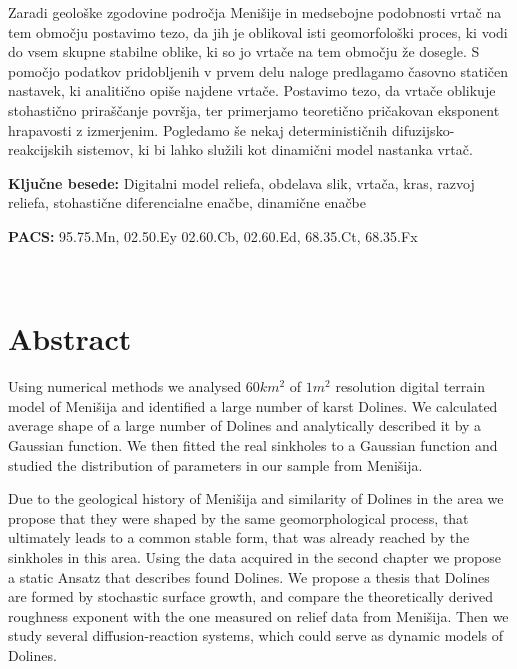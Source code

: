 \documentclass[a4paper, twoside, 12pt]{book}
\begin{document}
        Zaradi geološke zgodovine področja Menišije in medsebojne podobnosti vrtač na tem območju postavimo tezo, da jih je oblikoval isti geomorfološki proces, ki vodi do vsem skupne stabilne oblike, ki so jo vrtače na tem območju že dosegle.
        S pomočjo podatkov pridobljenih v prvem delu naloge predlagamo časovno statičen nastavek, ki analitično opiše najdene vrtače. Postavimo tezo, da vrtače oblikuje stohastično priraščanje površja, ter primerjamo teoretično pričakovan eksponent hrapavosti z izmerjenim. Pogledamo še nekaj determinističnih difuzijsko-reakcijskih sistemov, ki bi lahko služili kot dinamični model nastanka vrtač.

\vspace*{1cm}

\noindent \textbf{Ključne besede:} Digitalni model reliefa, obdelava slik, vrtača, kras, razvoj reliefa, stohastične diferencialne enačbe, dinamične enačbe
\smallskip

\noindent \textbf{PACS:} 95.75.Mn, 02.50.Ey 02.60.Cb, 02.60.Ed, 68.35.Ct, 68.35.Fx

\newpage
\ \thispagestyle{empty}

         
        \chapter*{Abstract}

        Using numerical methods we analysed $60 km^2$ of $1m^2$ resolution digital terrain model of Menišija and identified a large number of karst Dolines. We calculated average shape of a large number of Dolines and analytically described it by a Gaussian function. We then fitted the real sinkholes to a Gaussian function and studied the distribution of parameters in our sample from Menišija.

        Due to the geological history of Menišija and similarity of Dolines in the area we propose that they were shaped by the same geomorphological process, that ultimately leads to a common stable form, that was already reached by the sinkholes in this area.
        Using the data acquired in the second chapter we propose a static Ansatz that describes found Dolines. We propose a thesis that Dolines are formed by stochastic surface growth, and compare the theoretically derived roughness exponent with the one measured on relief data from Menišija. Then we study several diffusion-reaction systems, which could serve as dynamic models of Dolines.
\end{document}
